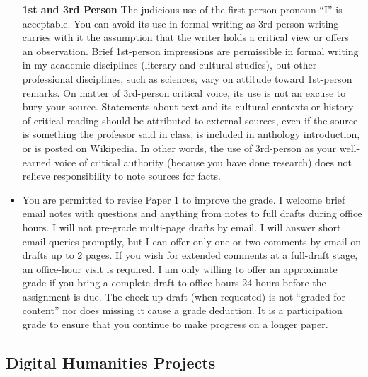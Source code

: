\documentclass[]{article}
\begin{document}
\begin{itemize}
  \textbf{1st and 3rd Person} The judicious use of the first-person
  pronoun ``I'' is acceptable. You can avoid its use in formal writing
  as 3rd-person writing carries with it the assumption that the writer
  holds a critical view or offers an observation. Brief 1st-person
  impressions are permissible in formal writing in my academic
  disciplines (literary and cultural studies), but other professional
  disciplines, such as sciences, vary on attitude toward 1st-person
  remarks. On matter of 3rd-person critical voice, its use is not an
  excuse to bury your source. Statements about text and its cultural
  contexts or history of critical reading should be attributed to
  external sources, even if the source is something the professor said
  in class, is included in anthology introduction, or is posted on
  Wikipedia. In other words, the use of 3rd-person as your well-earned
  voice of critical authority (because you have done research) does not
  relieve responsibility to note sources for facts.
\item
  You are permitted to revise Paper 1 to improve the grade. I welcome
  brief email notes with questions and anything from notes to full
  drafts during office hours. I will not pre-grade multi-page drafts by
  email. I will answer short email queries promptly, but I can offer
  only one or two comments by email on drafts up to 2 pages. If you wish
  for extended comments at a full-draft stage, an office-hour visit is
  required. I am only willing to offer an approximate grade if you bring
  a complete draft to office hours 24 hours before the assignment is
  due. The check-up draft (when requested) is not ``graded for content''
  nor does missing it cause a grade deduction. It is a participation
  grade to ensure that you continue to make progress on a longer paper.
\end{itemize}

\subsection{Digital Humanities
Projects}\label{digital-humanities-projects}
\end{document}
